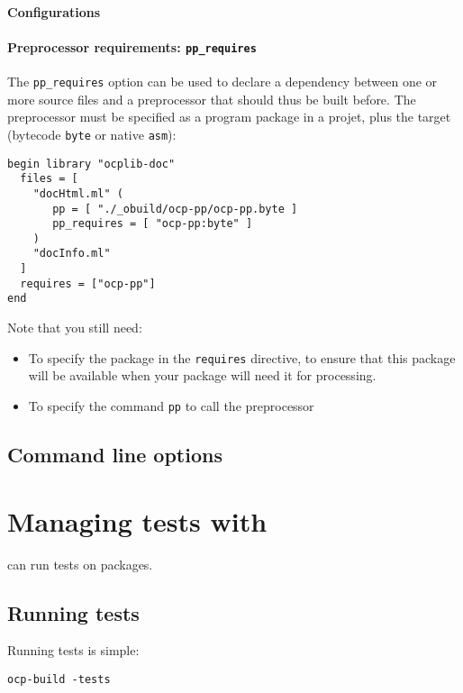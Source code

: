 \subsubsection{Configurations}

\subsubsection{Preprocessor requirements: {\tt pp\_requires}}

The {\tt pp\_requires} option can be used to declare a dependency
between one or more source files and a preprocessor that should thus
be built before. The preprocessor must be specified as a program
package in a projet, plus the target (bytecode {\tt byte} or native
{\tt asm}):

\begin{verbatim}
begin library "ocplib-doc"
  files = [
    "docHtml.ml" (
       pp = [ "./_obuild/ocp-pp/ocp-pp.byte ]
       pp_requires = [ "ocp-pp:byte" ]
    )
    "docInfo.ml"
  ]
  requires = ["ocp-pp"]
end
\end{verbatim}

Note that you still need:
\begin{itemize}
\item To specify the package in the {\tt requires} directive, to ensure that
  this package will be available when your package will need it for processing.
\item To specify the command {\tt pp} to call the preprocessor
\end{itemize}

\section{Command line options}

\chapter{Managing tests with \ocpbuild{}}

\ocpbuild{} can run tests on packages.

\section{Running tests}

Running tests is simple:
\begin{verbatim}
ocp-build -tests
\end{verbatim}

